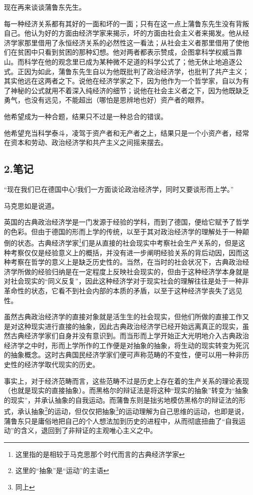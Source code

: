 \documentclass[a4paper,twoside,12pt]{ctexart}
\begin{document}
现在再来谈谈蒲鲁东先生。

每一种经济关系都有其好的一面和坏的一面；只有在这一点上蒲鲁东先生没有背叛自己。他认为好的方面由经济学家来揭示，坏的方面由社会主义者来揭发。他从经济学家那里借用了永恒经济关系的必然性这一看法；从社会主义者那里借用了使他们在贫困中只看到贫困的那种幻想。他对两者都表示赞成，企图拿科学权威当靠山。而科学在他的观念里已成为某种微不足道的科学公式了；他无休止地追逐公式。正因为如此，蒲鲁东先生自以为他既批判了政治经济学，也批判了共产主义；其实他远在这两者之下。说他在经济学家之下，因为他作为一个哲学家，自以为有了神秘的公式就用不着深入纯经济的细节；说他在社会主义者之下，因为他既缺乏勇气，也没有远见，不能超出（哪怕是思辨地也好）资产者的眼界。

他希望成为一种合题，结果只不过是一种总合的错误。

他希望充当科学泰斗，凌驾于资产者和无产者之上，结果只是一个小资产者，经常在资本和劳动、政治经济学和共产主义之间摇来摆去。

\newpage

\subsection{2.笔记}
\begin{fangsong}
    “现在我们已在德国中心!我们一方面谈论政治经济学，同时又要谈形而上学。”
\end{fangsong}
马克思如是说道。

英国的古典政治经济学是一门发源于经验的学科，而到了德国，便给它赋予了哲学的色彩。但由于德国的形而上学的传统，以至于其对政治经济学的理解处于一种颠倒的状态。古典经济学家\footnote{这里指的是相较于马克思那个时代而言的古典经济学家}们是从直接的社会现实中考察社会生产关系的，但是这种考察仅仅是经验意义上的概括，并没有进一步阐明经验关系的背后动因，因而这种考察在哲学的意义上是缺乏历史性的。当然，在当时的社会状况下，古典政治经济学所做的经验归纳是在一定程度上反映社会现实的，但由于这种经济学本身就是对社会现实的“同义反复”，因此这种经济学对于现实社会的理解往往是处于一种非革命性的状态，它看不到社会内部的本质的矛盾，以至于这种经济学丧失了远见性。

虽然古典政治经济学的直接对象就是活生生的社会现实，但他们所做的直接工作又是对这种现实进行直接的抽象，因此古典政治经济学已经开始远离真正的现实，虽然古典经济学家们自身并没有意识到。而当形而上学开始正大光明地介入古典政治经济学之中时，形而上学所作的工作便是对抽象的抽象，将生动的现实转变为死沉的抽象概念。这时古典国民经济学家们便可声称范畴的不变性，便可以用一种非历史性的经济学取代现实的历史。

事实上，对于经济范畴而言，这些范畴不过是历史上存在着的生产关系的理论表现（也就是现实的直接抽象）。而黑格尔的辩证法是将这种“现实的抽象”转变为“抽象的现实”，并承认抽象的自我运动。而蒲鲁东则是拙劣地模仿黑格尔的辩证法的形式，承认抽象\footnote{这里的“抽象”是“运动”的主语}的运动，但仅仅把抽象\footnote{同上}的运动理解为自己思维的运动，也即是说，蒲鲁东只是庸俗地把自己的个人想法加到历史的进程中，从而彻底扭曲了“自我运动”的含义，退回到了非辩证的主观唯心主义之中。
\end{document}
